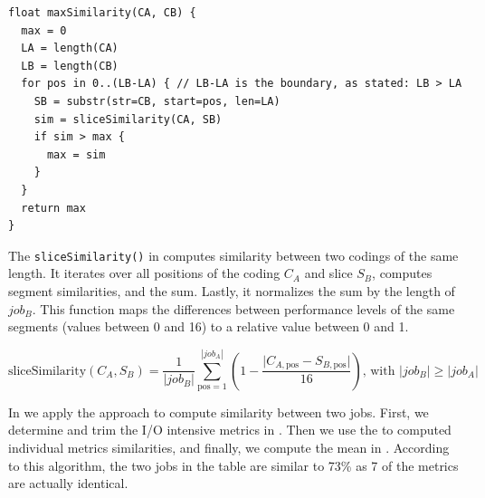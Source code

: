 \documentclass{jhps}
\begin{document}
\begin{lstlisting}[caption={Pseudo code of the maxSimilarity() function}]
float maxSimilarity(CA, CB) {
  max = 0
  LA = length(CA)
  LB = length(CB)
  for pos in 0..(LB-LA) { // LB-LA is the boundary, as stated: LB > LA
    SB = substr(str=CB, start=pos, len=LA)
    sim = sliceSimilarity(CA, SB)
    if sim > max {
      max = sim
    }
  }
  return max
}
\end{lstlisting}

The \texttt{sliceSimilarity()} in  computes similarity between two codings of the same length.
It iterates over all positions of the coding $C_A$ and slice $S_B$, computes segment similarities, and the sum.
Lastly, it normalizes the sum by the length of $job_B$.
This function maps the differences between performance levels of the same segments (values between 0 and 16) to a relative value between 0 and 1.

\begin{equation}
	\text{sliceSimilarity}\left(C_{A},S_{B}\right) = \frac{1}{|job_B|}\sum_{\text{pos}=1}^{|job_A|} \left(1 - \frac{\vert C_{A,\text{pos}}-S_{B,\text{pos}} \vert }{16}\right)\text{, with }|job_{B}| \geq |job_{A}| \label{eq:slicesim}
\end{equation}

In  we apply the approach to compute similarity between two jobs.
First, we determine and trim the I/O intensive metrics in .
Then we use the  to computed individual metrics similarities, and finally, we compute the mean in .
According to this algorithm, the two jobs in the table are similar to 73\% as 7 of the metrics are actually identical.
\end{document}
